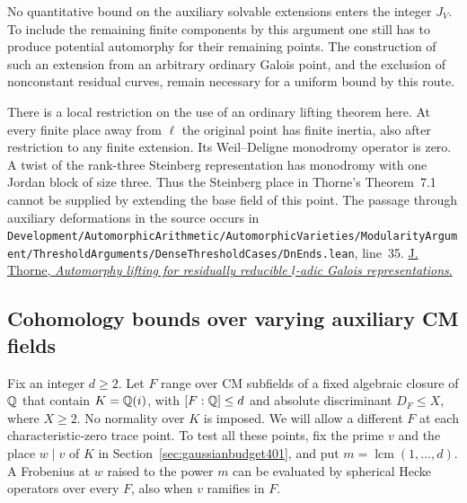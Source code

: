 \documentclass[a4paper,11pt]{article}
\theoremstyle{definition}
\theoremstyle{remark}
\newcommand{\srcloc}[2]{{\small\nolinkurl{#1.lean}}, line~#2}
\numberwithin{equation}{section}
\begin{document}
No quantitative bound on the auxiliary solvable extensions
enters the integer \(J_V\). To include the remaining finite
components by this argument one still has to produce potential
automorphy for their remaining points. The construction of such
an extension from an arbitrary ordinary Galois point, and the
exclusion of nonconstant residual curves, remain necessary for
a uniform bound by this route.

There is a local restriction on the use of an ordinary lifting
theorem here. At every finite place away from \(\ell\) the original
point has finite inertia, also after restriction to any finite
extension. Its Weil--Deligne monodromy operator is zero. A twist
of the rank-three Steinberg representation has monodromy with
one Jordan block of size three. Thus the Steinberg place in
Thorne's Theorem~7.1 cannot be supplied by extending the base
field of this point. The passage through auxiliary deformations
in the source occurs in
\srcloc{Development/AutomorphicArithmetic/AutomorphicVarieties/ModularityArgument/ThresholdArguments/DenseThresholdCases/DnEnds}{35}.
\href{https://www.dpmms.cam.ac.uk/~jat58/reducible_lifting.pdf}{J. Thorne, \emph{Automorphy lifting for residually reducible \(l\)-adic Galois representations}.}


\subsection{Cohomology bounds over varying auxiliary CM fields}
\label{sec:cmcores403}

Fix an integer \(d\ge2\). Let \(F\) range over CM subfields of a fixed
algebraic closure of \(\mathbb Q\) that contain \(K=\mathbb Q(i)\), with
\([F:\mathbb Q]\le d\) and absolute discriminant \(D_F\le X\), where
\(X\ge2\). No normality over \(K\) is imposed. We will allow a
different \(F\) at each characteristic-zero trace point. To test
all these points, fix the prime \(v\) and the place \(w\mid v\) of
\(K\) in Section~\ref{sec:gaussianbudget401}, and put
\(m=\operatorname{lcm}(1,\ldots,d)\). A Frobenius at \(w\) raised
to the power \(m\) can be evaluated by spherical Hecke operators
over every \(F\), also when \(v\) ramifies in \(F\).
\end{document}
